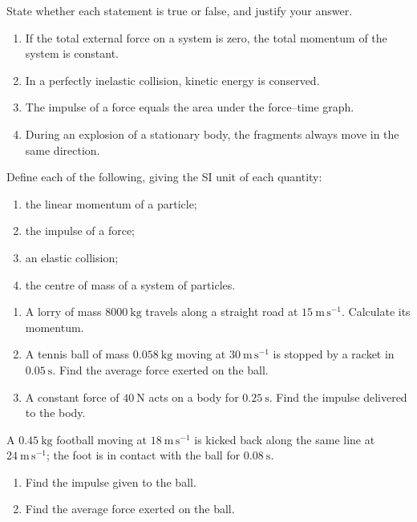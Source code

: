 \documentclass[11pt]{article}
\newcounter{popsec}
\newcounter{popsub}
\newcommand{\courssub}[1]{%
  \stepcounter{popsub}%
  \par\vspace{9pt}\noindent{\popxbold\fontsize{11.5}{13}\selectfont\color{popink}{\color{poporange}\thepopsec.\thepopsub}\hspace{6pt}#1}\par\nopagebreak\vspace{4pt}
}
\begin{document}
\begin{exercice}
State whether each statement is true or false, and justify your answer.
\begin{enumerate}
\item If the total external force on a system is zero, the total momentum of the system is constant.
\item In a perfectly inelastic collision, kinetic energy is conserved.
\item The impulse of a force equals the area under the force--time graph.
\item During an explosion of a stationary body, the fragments always move in the same direction.
\end{enumerate}
\end{exercice}

\begin{exercice}[Definitions]
Define each of the following, giving the SI unit of each quantity:
\begin{enumerate}
\item the linear momentum of a particle;
\item the impulse of a force;
\item an elastic collision;
\item the centre of mass of a system of particles.
\end{enumerate}
\end{exercice}

\begin{exercice}
\begin{enumerate}
\item A lorry of mass $8000\ \mathrm{kg}$ travels along a straight road at $15\ \mathrm{m\,s^{-1}}$. Calculate its momentum.
\item A tennis ball of mass $0.058\ \mathrm{kg}$ moving at $30\ \mathrm{m\,s^{-1}}$ is stopped by a racket in $0.05\ \mathrm{s}$. Find the average force exerted on the ball.
\item A constant force of $40\ \mathrm{N}$ acts on a body for $0.25\ \mathrm{s}$. Find the impulse delivered to the body.
\end{enumerate}
\end{exercice}

\courssub{I practise}

\begin{exercice}
A $0.45\ \mathrm{kg}$ football moving at $18\ \mathrm{m\,s^{-1}}$ is kicked back along the same line at $24\ \mathrm{m\,s^{-1}}$; the foot is in contact with the ball for $0.08\ \mathrm{s}$.
\begin{enumerate}
\item Find the impulse given to the ball.
\item Find the average force exerted on the ball.
\end{enumerate}
\end{exercice}
\end{document}
